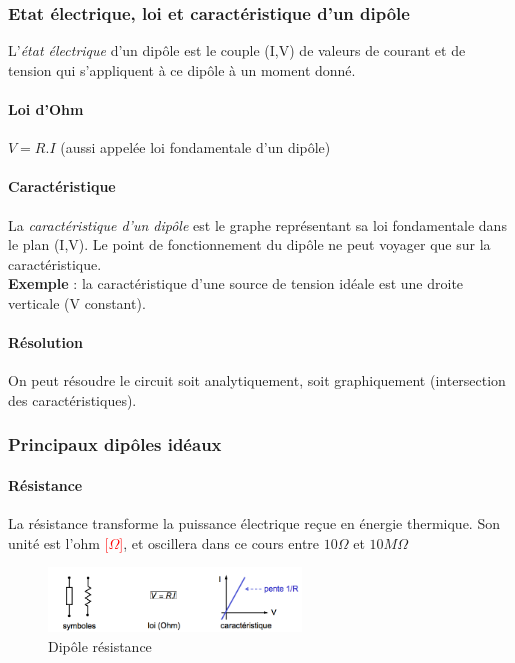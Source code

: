 \documentclass[a4paper]{article}
\begin{document}
    \subsubsection{Etat électrique, loi et caractéristique d'un dipôle}
    L'\textit{état électrique} d'un dipôle est le couple (I,V) de valeurs de
    courant et de tension qui s'appliquent à ce dipôle à un moment donné.

    \paragraph{Loi d'Ohm} $V = R.I$ (aussi appelée loi fondamentale d'un dipôle)

    \paragraph{Caractéristique} La \textit{caractéristique d'un dipôle} est le
    graphe représentant sa loi fondamentale dans le plan (I,V). Le point de fonctionnement
    du dipôle ne peut voyager que sur la caractéristique. \\
    \textbf{Exemple} : la caractéristique d'une source de tension idéale est une
    droite verticale (V constant).

    \paragraph{Résolution} On peut résoudre le circuit soit analytiquement, soit
    graphiquement (intersection des caractéristiques).

    \subsubsection{Principaux dipôles idéaux}
    \paragraph{Résistance} La résistance transforme la puissance électrique reçue
    en énergie thermique. Son unité est l'ohm \textcolor{red}{[$\Omega$]}, et
    oscillera dans ce cours entre $10\Omega$ et $10M\Omega$
    \begin{figure}[H]
        \begin{center}
            \includegraphics[width=0.6\textwidth]{fig/2_resistance.png}
            \caption{Dipôle résistance}
        \end{center}
    \end{figure}
\end{document}
